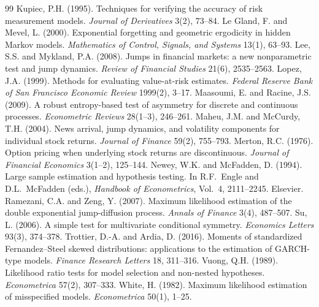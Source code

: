 \documentclass[11pt,a4paper]{article}
\theoremstyle{definition}
\theoremstyle{remark}
\begin{document}
\begin{thebibliography}{99}
 Kupiec, P.H. (1995). Techniques for verifying the accuracy of risk measurement models. \emph{Journal of Derivatives} 3(2), 73--84.
 Le Gland, F. and Mevel, L. (2000). Exponential forgetting and geometric ergodicity in hidden Markov models. \emph{Mathematics of Control, Signals, and Systems} 13(1), 63--93.
 Lee, S.S. and Mykland, P.A. (2008). Jumps in financial markets: a new nonparametric test and jump dynamics. \emph{Review of Financial Studies} 21(6), 2535--2563.
 Lopez, J.A. (1999). Methods for evaluating value-at-risk estimates. \emph{Federal Reserve Bank of San Francisco Economic Review} 1999(2), 3--17.
 Maasoumi, E. and Racine, J.S. (2009). A robust entropy-based test of asymmetry for discrete and continuous processes. \emph{Econometric Reviews} 28(1--3), 246--261.
 Maheu, J.M. and McCurdy, T.H. (2004). News arrival, jump dynamics, and volatility components for individual stock returns. \emph{Journal of Finance} 59(2), 755--793.
 Merton, R.C. (1976). Option pricing when underlying stock returns are discontinuous. \emph{Journal of Financial Economics} 3(1--2), 125--144.
 Newey, W.K. and McFadden, D. (1994). Large sample estimation and hypothesis testing. In R.F.~Engle and D.L.~McFadden (eds.), \emph{Handbook of Econometrics}, Vol.~4, 2111--2245. Elsevier.
 Ramezani, C.A. and Zeng, Y. (2007). Maximum likelihood estimation of the double exponential jump-diffusion process. \emph{Annals of Finance} 3(4), 487--507.
 Su, L. (2006). A simple test for multivariate conditional symmetry. \emph{Economics Letters} 93(3), 374--378.
 Trottier, D.-A. and Ardia, D. (2016). Moments of standardized Fernandez--Steel skewed distributions: applications to the estimation of GARCH-type models. \emph{Finance Research Letters} 18, 311--316.
 Vuong, Q.H. (1989). Likelihood ratio tests for model selection and non-nested hypotheses. \emph{Econometrica} 57(2), 307--333.
 White, H. (1982). Maximum likelihood estimation of misspecified models. \emph{Econometrica} 50(1), 1--25.
\end{thebibliography}
\end{document}
